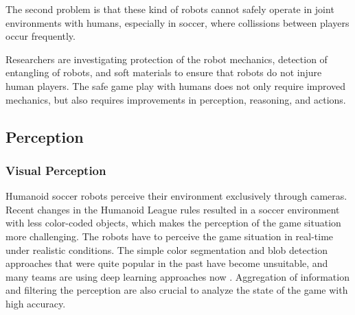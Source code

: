 \documentclass{article}
\begin{document}
The second problem is that these kind of robots cannot safely operate in joint environments with humans, especially in soccer, where collissions between players occur frequently.

Researchers are investigating protection of the robot mechanics, detection of entangling of robots, and soft materials to ensure that robots do not injure human players.
The safe game play with humans does not only require improved mechanics, but also requires improvements in perception, reasoning, and actions.




\subsection{Perception}
\subsubsection{Visual Perception}
Humanoid soccer robots perceive their environment exclusively through cameras. 
Recent changes in the Humanoid League rules resulted in a soccer environment with less color-coded objects, which makes the perception of the game situation more challenging.
The robots have to perceive the game situation in real-time under realistic conditions.
The simple color segmentation and blob detection approaches that were quite popular in the past \cite{Farazi2015} have become unsuitable, and many teams are using deep learning approaches now \cite{ficht2018nimbro} \cite{schnekenburger2017detection}. 
Aggregation of information and filtering the perception are also crucial to analyze the state of the game with high accuracy.
\end{document}
